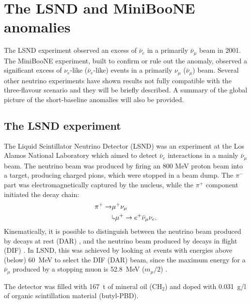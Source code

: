 \chapter{\label{ch:3-anomalies}The LSND and MiniBooNE anomalies}

\minitoc

The LSND experiment observed an excess of $\bar{\nu}_{e}$ in a primarily $\bar{\nu}_{\mu}$ beam in 2001. The MiniBooNE experiment, built to confirm or rule out the anomaly, observed a significant excess of $\nu_{e}$-like ($\bar{\nu}_{e}$-like) events in a primarily $\nu_{\mu}$ ($\bar{\nu}_{\mu}$) beam. Several other neutrino experiments have shown results not fully compatible with the three-flavour scenario and they will be briefly described.  A summary of the global picture of the short-baseline anomalies will also be provided.

\section{The LSND experiment}
The Liquid Scintillator Neutrino Detector (LSND) was an experiment at the Los Alamos National Laboratory which aimed to detect $\bar{\nu}_e$ interactions in a mainly $\bar{\nu}_{\mu}$ beam. The neutrino beam was produced by firing an 800 MeV proton beam into a target, producing charged pions, which were stopped in a beam dump. The $\pi^-$ part was electromagnetically captured by the nucleus, while the $\pi^+$ component initiated the decay chain:
\begin{align}
    \pi^+ \rightarrow & \mu^+\nu_{\mu}\\
    & \rotatebox[origin=c]{180}{$\Lsh$}	 \mu^{+} \rightarrow e^+\bar{\nu}_{\mu}\nu_{e}.
\end{align}
Kinematically, it is possible to distinguish between the neutrino beam produced by decays at rest (DAR) , and the neutrino beam produced by decays in flight (DIF) . In LSND, this was achieved by looking at events with energies above (below) 60~MeV to select the DIF (DAR) beam, since the maximum energy for a $\bar{\nu}_{\mu}$ produced by a stopping muon is 52.8~MeV ($m_{\mu}/2$) .

The detector was filled with 167~t of mineral oil (CH$_2$) and doped with 0.031~g/l of organic scintillation material (butyl-PBD).

